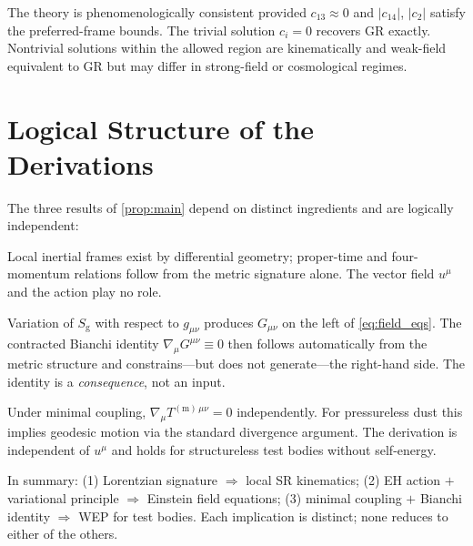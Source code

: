 \documentclass[12pt,a4paper]{article}
\newcommand{\EH}{S_{\mathrm{g}}}
\begin{document}
The theory is phenomenologically consistent provided $c_{13}\approx 0$ and
$|c_{14}|$, $|c_{2}|$ satisfy the preferred-frame bounds. The trivial solution
$c_{i}=0$ recovers GR exactly. Nontrivial solutions within the allowed region
are kinematically and weak-field equivalent to GR but may differ in strong-field
or cosmological regimes.

\section{Logical Structure of the Derivations}
\label{sec:logic}


The three results of \cref{prop:main} depend on distinct ingredients and are
logically independent:

\begin{description}[leftmargin=2em, labelsep=1em]
  \item[SR kinematics $\Leftarrow$ Lorentzian signature.]
    Local inertial frames exist by differential geometry; proper-time and
    four-momentum relations follow from the metric signature alone. The vector
    field $u^{\mu}$ and the action play no role.

  \item[Einstein field equations $\Leftarrow$ EH action $+$ variational principle.]
    Variation of $\EH$ with respect to $g_{\mu\nu}$ produces $G_{\mu\nu}$ on
    the left of \cref{eq:field_eqs}. The contracted Bianchi identity
    $\nabla_{\!\mu}G^{\mu\nu}\equiv 0$ then follows automatically from the
    metric structure and constrains---but does not generate---the right-hand
    side. The identity is a \emph{consequence}, not an input.

  \item[WEP for test bodies $\Leftarrow$ minimal coupling $+$ Bianchi identity.]
    Under minimal coupling, $\nabla_{\!\mu}T^{(\mathrm{m})\,\mu\nu}=0$
    independently. For pressureless dust this implies geodesic motion via the
    standard divergence argument. The derivation is independent of $u^{\mu}$
    and holds for structureless test bodies without self-energy.
\end{description}

In summary: (1) Lorentzian signature $\Rightarrow$ local SR kinematics;
(2) EH action $+$ variational principle $\Rightarrow$ Einstein field equations;
(3) minimal coupling $+$ Bianchi identity $\Rightarrow$ WEP for test bodies.
Each implication is distinct; none reduces to either of the others.
\end{document}

